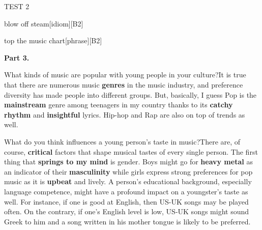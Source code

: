 \begin{glossarymc}[Cambridge 5]
\begin{test}{TEST 2}
\begin{VocabExplain}[Part 2]
            \begin{ExplainCard}{blow off steam}[idiom][B2]
            \end{ExplainCard}

            \begin{ExplainCard}{top the music chart}[phrase][B2]
            \end{ExplainCard}
        \end{VocabExplain}

    \noindent
    \textbf{Part 3.}
    \begin{qa}{What kinds of music are popular with young people in your culture?}{It is true that there are numerous music \textbf{genres} in the music industry, and preference diversity has made people into different groups. But, basically, I guess Pop is the \textbf{mainstream} genre among teenagers in my country thanks to its \textbf{catchy rhythm} and \textbf{insightful} lyrics. Hip-hop and Rap are also on top of trends as well.}
    \end{qa}

    \begin{qa}{What do you think influences a young person's taste in music?}{There are, of course, \textbf{critical} factors that shape musical tastes of every single person. The first thing that \textbf{springs to my mind} is gender. Boys might go for \textbf{heavy metal} as an indicator of their \textbf{masculinity} while girls express strong preferences for pop music as it is \textbf{upbeat} and lively. A person's educational background, especially language competence, might have a profound impact on a youngster's taste as well. For instance, if one is good at English, then US-UK songs may be played often. On the contrary, if one's English level is low, US-UK songs might sound Greek to him and a song written in his mother tongue is likely to be preferred.}
    \end{qa}


\end{test}
\end{glossarymc}
